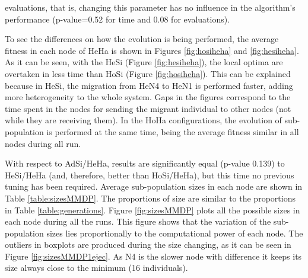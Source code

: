\documentclass[final,1p,times]{elsarticle}
\begin{document}
 evaluations, that is, changing this parameter has no influence in the
 algorithm's performance (p-value=0.52 for time and 0.08 for evaluations).











To see the differences on how the evolution is being performed, the average fitness in each node of HeHa is shown in Figures \ref{fig:hosiheha} and \ref{fig:hesiheha}. As it can be seen, with the HeSi (Figure \ref{fig:hesiheha}), the local optima are overtaken in less time than HoSi (Figure \ref{fig:hosiheha}).  This can be explained because in HeSi, the migration from HeN4 to HeN1 is performed faster, adding more heterogeneity to the whole system. Gaps in the figures correspond to the time spent in the nodes for sending the migrant individual to other nodes (not while they are receiving them). In the HoHa configurations, the evolution of sub-population is performed at the same time, being the average fitness similar in all nodes during all run. %



With respect to AdSi/HeHa, results are significantly  equal (p-value 0.139) to HeSi/HeHa (and, therefore, better than HoSi/HeHa), but this time no previous tuning has been required.  Average sub-population sizes in each node are shown in Table \ref{table:sizesMMDP}. The proportions of size are similar to the proportions in Table \ref{table:generations}. Figure \ref{fig:sizesMMDP} plots all the possible sizes in each node during all the runs. This figure shows that the variation of the sub-population sizes lies proportionally to the computational power of each node. The outliers in boxplots are produced during the size changing, as it can be seen in Figure \ref{fig:sizesMMDP1ejec}. As N4 is the slower node with difference it keeps its size always close to the minimum (16 individuals).


\begin{table}
\end{table}
\end{document}
